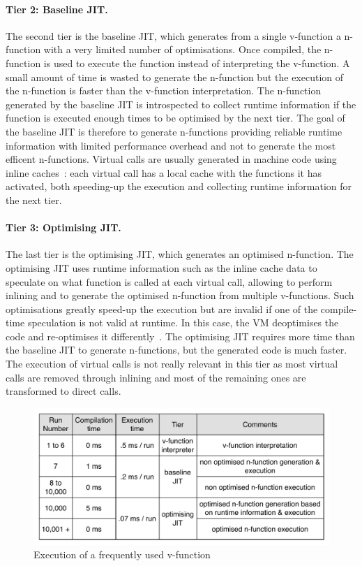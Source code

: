 \documentclass[a4paper,12pt,twoside]{../includes/ThesisStyle}
\begin{document}
\paragraph{Tier 2: Baseline JIT. } The second tier is the baseline JIT, which generates from a single v-function a n-function with a very limited number of optimisations. Once compiled, the n-function is used to execute the function instead of interpreting the v-function. A small amount of time is wasted to generate the n-function but the execution of the n-function is faster than the v-function interpretation. The n-function generated by the baseline JIT is introspected to collect runtime information if the function is executed enough times to be optimised by the next tier. The goal of the baseline JIT is therefore to generate n-functions providing reliable runtime information with limited performance overhead and not to generate the most efficent n-functions. Virtual calls are usually generated in machine code using inline caches~\cite{Deut84a,Holz91a}: each virtual call has a local cache with the functions it has activated, both speeding-up the execution and collecting runtime information for the next tier.
\paragraph{Tier 3: Optimising JIT. } The last tier is the optimising JIT, which generates an optimised n-function. The optimising JIT uses runtime information such as the inline cache data to speculate on what function is called at each virtual call, allowing to perform inlining and to generate the optimised n-function from multiple v-functions. Such optimisations greatly speed-up the execution but are invalid if one of the compile-time speculation is not valid at runtime. In this case, the VM deoptimises the code and re-optimises it differently~\cite{Holz94a,Holz92a}. The optimising JIT requires more time than the baseline JIT to generate n-functions, but the generated code is much faster. The execution of virtual calls is not really relevant in this tier as most virtual calls are removed through inlining and most of the remaining ones are transformed to direct calls.

\vspace{0.5em}

\begin{figure}[h!]
    \begin{center}
        \includegraphics[width=0.95\linewidth]{TieredArchitecture}
        \caption{Execution of a frequently used v-function}
        \label{fig:TieredArchitecture}
    \end{center}
\end{figure}
\end{document}
